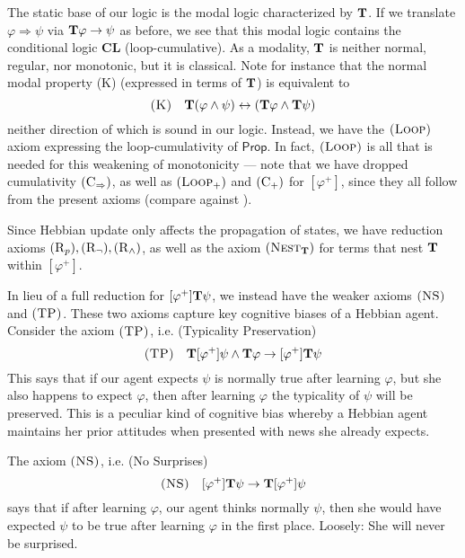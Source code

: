 \documentclass[letterpaper]{article}
\theoremstyle{definition}
\newcommand{\axiom}{\textsc}
\newcommand{\Typ}{\textrm{\textup{\textbf{T}}}}
\newcommand{\Prop}{\textsf{Prop}}
\begin{document}
The static base of our logic is the modal logic characterized by $\Typ$.  If we translate $\varphi \Rightarrow \psi$ via $\Typ \varphi \to \psi$ as before, we see that this modal logic contains the conditional logic \textbf{CL} (loop-cumulative).  As a modality, $\Typ$ is neither normal, regular, nor monotonic, but it is classical.  Note for instance that the normal modal property \axiom{(K)} (expressed in terms of $\Typ$) is equivalent to
\[
\axiom{(K)} \quad \Typ (\varphi \land \psi) \leftrightarrow (\Typ \varphi \land \Typ \psi)
\]
neither direction of which is sound in our logic.  Instead, we have the $\axiom{(Loop)}$ axiom expressing the loop-cumulativity of $\Prop$.  In fact, $\axiom{(Loop)}$ is all that is needed for this weakening of monotonicity --- note that we have dropped cumulativity $(\axiom{C}_\Rightarrow)$, as well as $(\axiom{Loop}_+)$ and $(\axiom{C}_+)$ for $[\varphi^+]$, since they all follow from the present axioms (compare against \citep{kisby2022logic}).

Since Hebbian update only affects the propagation of states, we have reduction axioms $(\axiom{R}_p), (\axiom{R}_\neg), (\axiom{R}_\land)$, as well as the axiom $(\axiom{Nest}_\Typ)$ for terms that nest $\Typ$ within $[\varphi^+]$.

In lieu of a full reduction for $[\varphi^+] \Typ \psi$, we instead have the weaker axioms $\axiom{(NS)}$ and $\axiom{(TP)}$.  These two axioms capture key cognitive biases of a Hebbian agent.  Consider the axiom $\axiom{(TP)}$, i.e. (Typicality Preservation)
\[
\axiom{(TP)} \quad \Typ [\varphi^+] \psi \land \Typ \varphi \to [\varphi^+] \Typ \psi
\]
This says that if our agent expects $\psi$ is normally true after learning $\varphi$, but she also happens to expect $\varphi$, then after learning $\varphi$ the typicality of $\psi$ will be preserved.  This is a peculiar kind of cognitive bias whereby a Hebbian agent maintains her prior attitudes when presented with news she already expects.

The axiom $\axiom{(NS)}$, i.e. (No Surprises)
\[
\axiom{(NS)} \quad [\varphi^+] \Typ \psi \to \Typ [\varphi^+] \psi
\]
says that if after learning $\varphi$, our agent thinks normally $\psi$, then she would have expected $\psi$ to be true after learning $\varphi$ in the first place.  Loosely: She will never be surprised.


\end{document}
